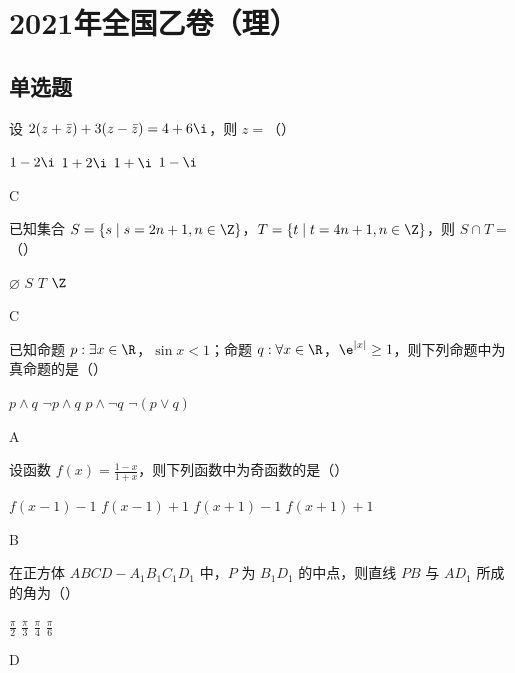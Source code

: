 \chapter{2021年全国乙卷（理）}

\section{单选题}

\begin{problem}
设 \(2(z+\bar z)+3(z-\bar z)=4+6\i\)，则 \(z=\)（\quad）

\choices
    {\(1-2\i\)}
    {\(1+2\i\)}
    {\(1+\i\)}
    {\(1-\i\)}

\begin{answer}
C
\end{answer}
\end{problem}

\begin{problem}
已知集合 \(S=\{s\mid s=2n+1,n\in\Z\}\)，\(T=\{t\mid t=4n+1,n\in\Z\}\)，则 \(S\cap T=\)（\quad）

\choices
    {\(\varnothing\)}
    {\(S\)}
    {\(T\)}
    {\(\Z\)}

\begin{answer}
C
\end{answer}
\end{problem}

\begin{problem}
已知命题 \(p:\exists x\in \R\)，\(\sin x<1\)；命题 \(q:\forall x\in \R\)，\(\e^{|x|}\ge 1\)，则下列命题中为真命题的是（\quad）

\choices
    {\(p\wedge q\)}
    {\(\neg p\wedge q\)}
    {\(p\wedge \neg q\)}
    {\(\neg\left( p\vee q \right)\)}

\begin{answer}
A
\end{answer}
\end{problem}

\begin{problem}
设函数 \(f(x)=\frac{1-x}{1+x}\)，则下列函数中为奇函数的是（\quad）

\choices
    {\(f(x-1)-1\)}
    {\(f(x-1)+1\)}
    {\(f(x+1)-1\)}
    {\(f(x+1)+1\)}

\begin{answer}
B
\end{answer}
\end{problem}

\begin{problem}
在正方体 \(ABCD-A_1B_1C_1D_1\) 中，\(P\) 为 \(B_1D_1\) 的中点，则直线 \(PB\) 与 \(AD_1\) 所成的角为（\quad）


\choices
    {\(\frac{\pi}{2}\)}
    {\(\frac{\pi}{3}\)}
    {\(\frac{\pi}{4}\)}
    {\(\frac{\pi}{6}\)}

\begin{answer}
D
\end{answer}
\end{problem}

